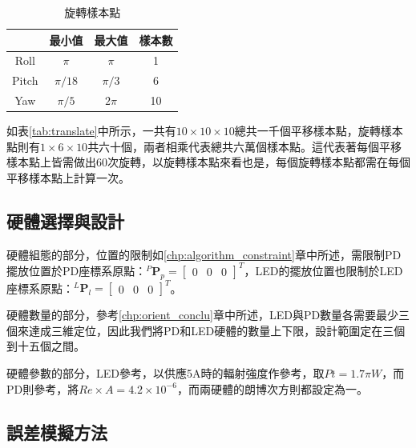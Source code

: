   \begin{table}[h!]
    \begin{center}
      \caption{旋轉樣本點}
      \label{tab:rotate}
      \begin{tabular}{c|c|c|c} %
        & \textbf{最小值} & \textbf{最大值}&\textbf{樣本數}\\
       \hline
       Roll & $\pi$ & $\pi$&1\\
       Pitch & $\pi/18$ &$\pi/3$&6\\
       Yaw & $\pi/5$ & $2\pi$&10\\
     \end{tabular}
   \end{center}
 \end{table}

如表\ref{tab:translate}中所示，一共有$10\times 10\times 10$總共一千個平移樣本點，旋轉樣本點則有$1\times 6\times 10$共六十個，兩者相乘代表總共六萬個樣本點。這代表著每個平移樣本點上皆需做出60次旋轉，以旋轉樣本點來看也是，每個旋轉樣本點都需在每個平移樣本點上計算一次。



\subsection{硬體選擇與設計}
\label{chp:hardware_design}

硬體組態的部分，位置的限制如\ref{chp:algorithm_constraint}章中所述，需限制PD擺放位置於PD座標系原點：$^P\boldsymbol{P}_p=
\left[\begin{array}{ccc}0&0&0\end{array}\right]^T$，LED的擺放位置也限制於LED座標系原點：$^L\boldsymbol{P}_l=
\left[\begin{array}{ccc}0&0&0\end{array}\right]^T$。

硬體數量的部分，參考\ref{chp:orient_conclu}章中所述，LED與PD數量各需要最少三個來達成三維定位，因此我們將PD和LED硬體的數量上下限，設計範圍定在三個到十五個之間。

硬體參數的部分，LED參考\cite{datasheet:led_vsma}，以供應5A時的輻射強度作參考，取$Pt=1.7\pi W$，而PD則參考\cite{datasheet:BPW}，將$Re\times A = 4.2\times10^{-6}$，而兩硬體的朗博次方則都設定為一。


\subsection{誤差模擬方法}
\label{chp:hardware_error}


